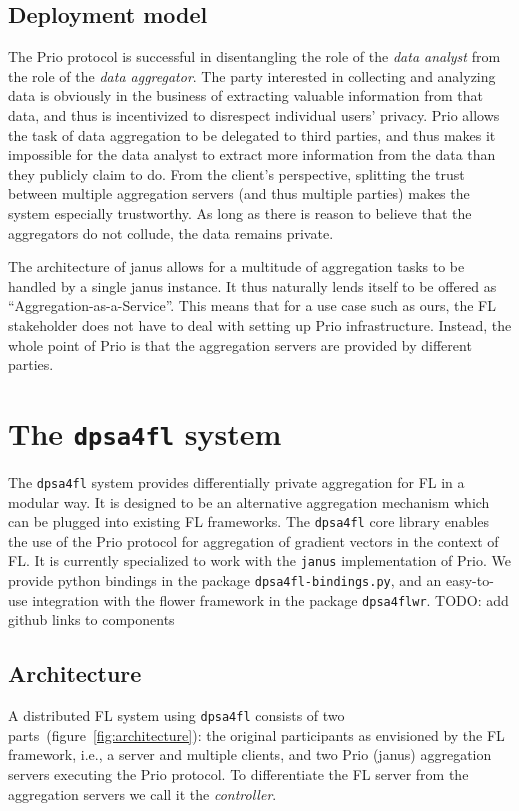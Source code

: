 \documentclass{article}
\begin{document}
\subsection{Deployment model}
The Prio protocol is successful in disentangling the role of the \textit{data
  analyst} from the role of the \textit{data aggregator}. The party interested
in collecting and analyzing data is obviously in the business of extracting valuable
information from that data, and thus is incentivized to disrespect individual
users' privacy. Prio allows the task of data aggregation to be delegated to
third parties, and thus makes it impossible for the data analyst to extract more
information from the data than they publicly claim to do. From the client's
perspective, splitting the trust between multiple aggregation servers (and thus
multiple parties) makes the system especially trustworthy. As long as there is
reason to believe that the aggregators do not collude, the data
remains private.

The architecture of janus allows for a multitude of aggregation tasks
to be handled by a single janus instance. It thus naturally lends itself to be
offered as ``Aggregation-as-a-Service''. This means that for a use case such as
ours, the FL stakeholder does not have to deal with setting up Prio
infrastructure. Instead, the whole point of Prio is that the aggregation servers
are provided by different parties.

\section{The \texttt{dpsa4fl} system}
The \texttt{dpsa4fl} system provides differentially private aggregation for FL in a
modular way. It is designed to be an alternative aggregation mechanism which can
be plugged into existing FL frameworks. The \texttt{dpsa4fl} core library
enables the use of the Prio protocol for aggregation of gradient vectors in the
context of FL. It is currently specialized to work with the \texttt{janus}
implementation of Prio. We provide python bindings in the package
\texttt{dpsa4fl-bindings.py}, and an easy-to-use integration with the flower
framework in the package \texttt{dpsa4flwr}.
{\color{green}TODO: add github links to components}

\subsection{Architecture}
A distributed FL system using \texttt{dpsa4fl} consists of
two parts~(figure~\ref{fig:architecture}): the original participants as envisioned by the FL
framework, i.e., a server and multiple clients, and two Prio (janus) aggregation servers
executing the Prio protocol. To differentiate the FL server from the aggregation
servers we call it the \textit{controller}.
\end{document}
